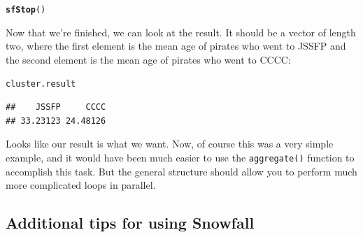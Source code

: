 \documentclass{tufte-book}\usepackage[]{graphicx}\usepackage[]{color}
\makeatletter
\newcommand{\hlstd}[1]{\textcolor[rgb]{0.345,0.345,0.345}{#1}}%
\newcommand{\hlkwd}[1]{\textcolor[rgb]{0.737,0.353,0.396}{\textbf{#1}}}%
\newenvironment{kframe}{%
 \def\at@end@of@kframe{}%
 \ifinner\ifhmode%
  \def\at@end@of@kframe{\end{minipage}}%
  \begin{minipage}{\columnwidth}%
 \fi\fi%
 \def\FrameCommand##1{\hskip\@totalleftmargin \hskip-\fboxsep
 \colorbox{shadecolor}{##1}\hskip-\fboxsep
     \hskip-\linewidth \hskip-\@totalleftmargin \hskip\columnwidth}%
 \MakeFramed {\advance\hsize-\width
   \@totalleftmargin\z@ \linewidth\hsize
   \@setminipage}}%
 {\par\unskip\endMakeFramed%
 \at@end@of@kframe}
\newenvironment{knitrout}{}{} %
\makeatother
\begin{document}
\begin{knitrout}
\color{fgcolor}\begin{kframe}
\begin{alltt}
\hlkwd{sfStop}\hlstd{()}
\end{alltt}


{\ttfamily\noindent\itshape\color{messagecolor}{\#\# \\\#\# Stopping cluster}}\end{kframe}
\end{knitrout}

Now that we're finished, we can look at the result. It should be a vector of length two, where the first element is the mean age of pirates who went to JSSFP and the second element is the mean age of pirates who went to CCCC:

\begin{knitrout}
\color{fgcolor}\begin{kframe}
\begin{alltt}
\hlstd{cluster.result}
\end{alltt}
\begin{verbatim}
##    JSSFP     CCCC 
## 33.23123 24.48126
\end{verbatim}
\end{kframe}
\end{knitrout}

Looks like our result is what we want. Now, of course this was a very simple example, and it would have been much easier to use the \texttt{aggregate()} function to accomplish this task. But the general structure should allow you to perform much more complicated loops in parallel.

\subsection{Additional tips for using Snowfall}
\end{document}
